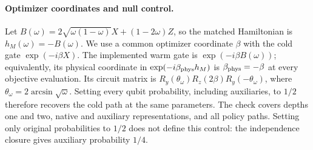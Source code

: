 \paragraph{Optimizer coordinates and null control.}
Let $B(\omega)=2\sqrt{\omega(1-\omega)}X+(1-2\omega)Z$, so the
matched Hamiltonian is $h_M(\omega)=-B(\omega)$. We use a common
optimizer coordinate $\beta$ with the cold gate $\exp(-i\beta X)$.
The implemented warm gate is $\exp(-i\beta B(\omega))$;
equivalently, its physical coordinate in $\exp(-i\beta_{\rm phys}h_M)$
is $\beta_{\rm phys}=-\beta$ at every objective evaluation.
Its circuit matrix is $R_y(\theta_\omega)R_z(2\beta)R_y(-\theta_\omega)$,
where $\theta_\omega=2\arcsin\sqrt{\omega}$.
Setting every qubit probability, including auxiliaries, to $1/2$
therefore recovers the cold path at the same parameters. The check covers
depths one and two, native and auxiliary representations, and all policy
paths. Setting only original probabilities to $1/2$ does not define this
control: the independence closure gives auxiliary probability $1/4$.
